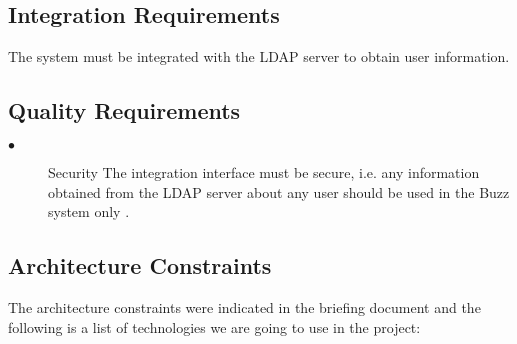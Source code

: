 \documentclass[12pt]{article}
\begin{document}
\subsection{Integration Requirements}
The system must be integrated with the LDAP server to obtain user information.
\subsection{Quality Requirements}
\begin{description}
\item[$\bullet$]Security
The integration interface must be secure, i.e. any information obtained from the LDAP server about any user should be used in the Buzz system only .
\end{description}
\subsection{Architecture Constraints}

The architecture constraints were indicated in the briefing document and the following is a list of technologies we are going to use in the project:
\end{document}
